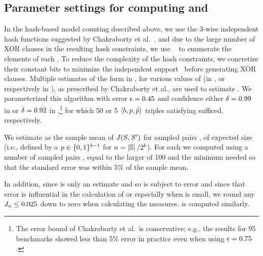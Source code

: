 \subsection{Parameter settings for computing
\Jaccard{\secretsSetSize} and \JaccardRand{\secretsSetSize}}
\label{sscf:sec:impl:modeling}
In the hash-based model counting described above, we use the 3-wise
independent hash functions suggested by Chakraborty et
al.~\cite{Chakraborty:2013:SAM:2961240.2961265}, and due to the large
number of XOR clauses in the resulting hash constraints, we use
\cryptominisat~\cite{soos2016cryptominisat} to enumerate the elements
of each
\possibleDoublesSubset{\hashFnOutputPrefix}{\hashFnOutputPrefixAlt}{}.
To reduce the complexity of the hash constraints, we concretize their
constant bits to minimize the independent
support~\cite{ivrii2016computing} before generating XOR clauses.
Multiple estimates of the form in
, for various values of
\hashFnOutputPrefixBits (in , or
respectively \hashFnOutputPrefixBitsAlt in ), as
prescribed by Chakraborty et al., are used to estimate
\setSize{\possibleDoubles{\hashFnOutputPrefix}}.  We parameterized
this algorithm with error $\epsilon = 0.45$ and confidence either
$\delta = 0.99$ in  or $\delta = 0.92$ in
,\footnote{The error bound of Chakroborty et
  al.\ is conservative; e.g., the results for 95 benchmarks showed
  less than 5\% error in practice even when using $\epsilon = 0.75$
  \cite{Chakraborty:2013:SAM:2961240.2961265}.} for which 50 or 5
$\langle b, p,
\hat{p}\rangle$ triples satisfying 
sufficed, respectively.

We estimate \Jaccard{\secretsSetSize} as the sample mean of
$J_{}(S_{}, S_{}')$ for sampled pairs
\secretsSet{}, \secretsSetAlt{} of expected size \secretsSetSize
(i.e., defined by a $p \in
\{0,1\}^{b-1}$ for {$n =
\left|{\mathbb{S}}\right|/2^{b}$}).  For each
\secretsSetSize we computed \Jaccard{\secretsSetSize} using a number
of sampled pairs \secretsSet{}, \secretsSetAlt{} equal to the larger
of 100 and the minimum needed so that the standard error was within
$5\%$ of the sample mean.

In addition, since \Jaccard{\secretsSetSize} is only an
estimate and so is subject to error and since that error is
influential in the calculation of \secretsSetSizeMax{} or
\secretsSetSizeMin{} especially when \secretsSetSize{} is small, we
round any $J_{n} \le 0.025$ down to zero when
calculating the measures.  \JaccardRand{\secretsSetSize} is computed
similarly.

